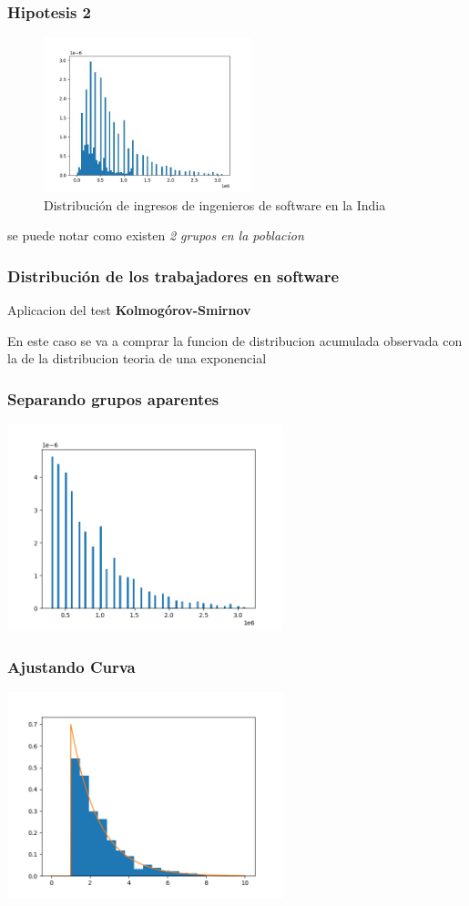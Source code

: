 \documentclass{beamer}
\begin{document}
\begin{frame}
\frametitle{Hipotesis 2}

\begin{figure}[h]
  \caption{Distribución de ingresos de ingenieros de
  software en la India}
  \includegraphics[width=6cm]{distribucion_ingresos_sw.jpeg}
\end{figure}

  se puede notar como existen \textit{2 grupos en la poblacion}
\end{frame}

\begin{frame}
  \frametitle{Distribución de los trabajadores en software}
  \alert{Aplicacion del test \textbf{Kolmogórov-Smirnov}}

  En este caso se va a comprar la funcion de distribucion acumulada observada
  con la de la distribucion teoria de una exponencial

\end{frame}

\begin{frame}
  \frametitle{Separando grupos aparentes}
  \includegraphics[width=8cm]{procesado.png}

\end{frame}

\begin{frame}
  \frametitle{Ajustando Curva}
  \includegraphics[width=8cm]{hip2/ajustando_curva.png}

\end{frame}
\end{document}

